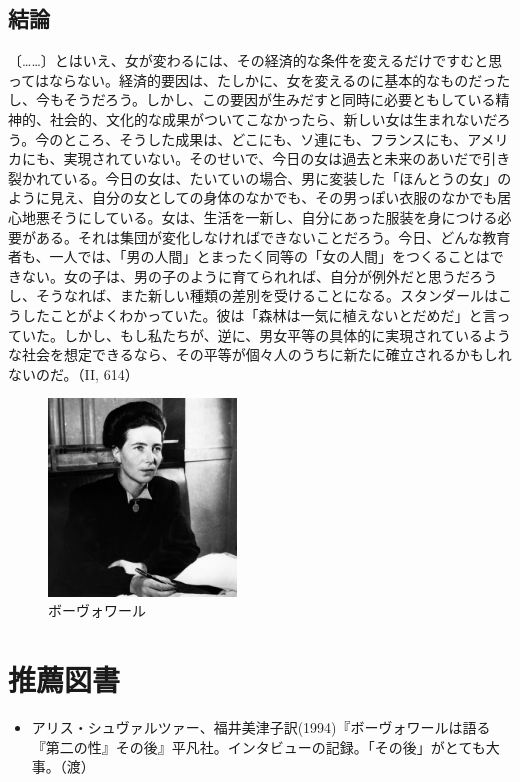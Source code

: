 \subsection{結論}


〔……〕とはいえ、女が変わるには、その経済的な条件を変えるだけですむと思ってはならない。経済的要因は、たしかに、女を変えるのに基本的なものだったし、今もそうだろう。しかし、この要因が生みだすと同時に必要ともしている精神的、社会的、文化的な成果がついてこなかったら、新しい女は生まれないだろう。今のところ、そうした成果は、どこにも、ソ連にも、フランスにも、アメリカにも、実現されていない。そのせいで、今日の女は過去と未来のあいだで引き裂かれている。今日の女は、たいていの場合、男に変装した「ほんとうの女」のように見え、自分の女としての身体のなかでも、その男っぽい衣服のなかでも居心地悪そうにしている。女は、生活を一新し、自分にあった服装を身につける必要がある。それは集団が変化しなければできないことだろう。今日、どんな教育者も、一人では、「男の人間」とまったく同等の「女の人間」をつくることはできない。女の子は、男の子のように育てられれば、自分が例外だと思うだろうし、そうなれば、また新しい種類の差別を受けることになる。スタンダールはこうしたことがよくわかっていた。彼は「森林は一気に植えないとだめだ」と言っていた。しかし、もし私たちが、逆に、男女平等の具体的に実現されているような社会を想定できるなら、その平等が個々人のうちに新たに確立されるかもしれないのだ。（II, 614）




 \begin{figure}[htbp]
 \center
      \includegraphics[width=50mm]{images/beauvoir.jpg}
   \caption{ボーヴォワール}
 \end{figure}


\section{推薦図書}

\begin{itemize}
\item  アリス・シュヴァルツァー、福井美津子訳(1994)『ボーヴォワールは語る　『第二の性』その後』平凡社。インタビューの記録。「その後」がとても大事。（渡）
\end{itemize}






